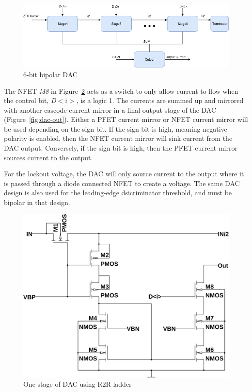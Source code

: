 \documentclass[12pt,oneside,final]{siuethesis}
\theoremstyle{definition}
\begin{document}
\begin{figure}[htbp!]
\centering
\includegraphics[scale=.55,keepaspectratio=true]{./ch3_figures/dac.png} 
\caption{6-bit bipolar DAC}
\label{fig:dac-block}
\end{figure}

\par The NFET \emph{M8} in Figure~\ref{fig:dac} acts as a switch to only allow current to flow when the control bit, \emph{D$<i>$}, is a logic 1. The currents are summed up and mirrored with another cascode current mirror in a final output stage of the DAC (Figure~\ref{fig:dac-out}). Either a PFET current mirror or NFET current mirror will be used depending on the sign bit. If the sign bit is high, meaning negative polarity is enabled, then the NFET current mirror will sink current from the DAC output. Conversely, if the sign bit is high, then the PFET current mirror sources current to the output.
\par For the lockout voltage, the DAC will only source current to the output where it is passed through a diode connected NFET to create a voltage. The same DAC design is also used for the leading-edge dsicriminator threshold, and must be bipolar in that design. 

\begin{figure}[htbp!]
\centering
\includegraphics[scale=.4,keepaspectratio=true]{../LTspice_Drawings/dac/dac_stage.png} 
\caption{One stage of DAC using R2R ladder}
\label{fig:dac}
\end{figure}
\end{document}
